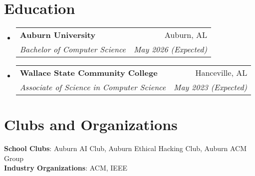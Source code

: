 \documentclass[letterpaper,11pt]{article}
\makeatletter
\newcommand{\resumeSubheading}[4]{
  \vspace{-2pt}\item
    \begin{tabular*}{0.97\textwidth}[t]{l@{\extracolsep{\fill}}r}
      \textbf{#1} & #2 \\
      \textit{\small#3} & \textit{\small #4} \\
    \end{tabular*}\vspace{-7pt}
}
\newcommand{\resumeSubHeadingListStart}{\begin{itemize}[leftmargin=0.15in, label={}]}
\newcommand{\resumeSubHeadingListEnd}{\end{itemize}}
\makeatother
\begin{document}
\section{Education}
\resumeSubHeadingListStart
\resumeSubheading
    {Auburn University}{Auburn, AL}
    {Bachelor of Computer Science}{May 2026 (Expected)}
\resumeSubheading
    {Wallace State Community College}{Hanceville, AL}
    {Associate of Science in Computer Science}{May 2023 (Expected)}
\resumeSubHeadingListEnd

\section{Clubs and Organizations}
\begin{itemize}[leftmargin=0.15in, label={}]
  \small{\item{
   \textbf{School Clubs}{: Auburn AI Club, Auburn Ethical Hacking Club, Auburn ACM Group} \\
   \textbf{Industry Organizations}{: ACM, IEEE} \\
  }}
\end{itemize}


\end{document}
